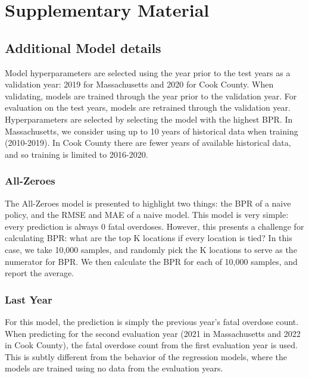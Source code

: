 \section{Supplementary Material}\label{supplementary-material}

\subsection{Additional Model details}\label{additional-model-details}

Model hyperparameters are selected using the year prior to the test years as a validation year: 2019 for Massachusetts and 2020 for Cook County. When validating, models are trained through the year prior to the validation year. For evaluation on the test years, models are retrained through the validation year. Hyperparameters are selected by selecting the model with the highest BPR. In Massachusetts, we consider using up to 10 years of historical data when training (2010-2019). In Cook County there are fewer years of available historical data, and so training is limited to 2016-2020.

\subsubsection{All-Zeroes}\label{all-zeroes}

The All-Zeroes model is presented to highlight two things: the BPR of a naive policy, and the RMSE and MAE of a naive model. This model is very simple: every prediction is always 0 fatal overdoses. However, this presents a challenge for calculating BPR: what are the top K locations if every location is tied? In this case, we take 10,000 samples, and randomly pick the K locations to serve as the numerator for BPR. We then calculate the BPR for each of 10,000 samples, and report the average.

\subsubsection{Last Year}\label{last-year}

For this model, the prediction is simply the previous year's fatal overdose count. When predicting for the second evaluation year (2021 in Massachusetts and 2022 in Cook County), the fatal overdose count from the first evaluation year is used. This is subtly different from the behavior of the regression models, where the models are trained using no data from the evaluation years.

